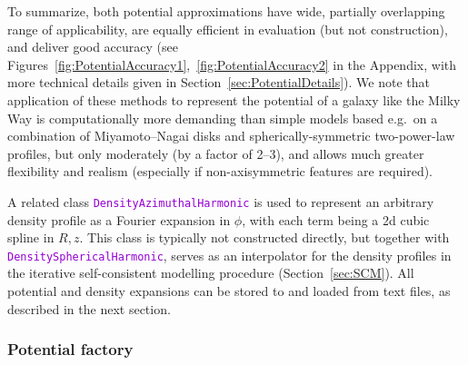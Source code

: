 \documentclass[12pt]{article}
\newcommand{\ttt}[1]{\textcolor{darkviolet}{\texttt{#1}}}
\begin{document}
To summarize, both potential approximations have wide, partially overlapping range of applicability, are equally efficient in evaluation (but not construction), and deliver good accuracy (see Figures~\ref{fig:PotentialAccuracy1},~\ref{fig:PotentialAccuracy2} in the Appendix, with more technical details given in Section~\ref{sec:PotentialDetails}).
We note that application of these methods to represent the potential of a galaxy like the Milky Way is computationally more demanding than simple models based e.g.\ on a combination of Miyamoto--Nagai disks and spherically-symmetric two-power-law profiles, but only moderately (by a factor of 2--3), and allows much greater flexibility and realism (especially if non-axisymmetric features are required).

A related class \ttt{DensityAzimuthalHarmonic} is used to represent an arbitrary density profile as a Fourier expansion in $\phi$, with each term being a 2d cubic spline in $R,z$. This class is typically not constructed directly, but together with \ttt{DensitySphericalHarmonic}, serves as an interpolator for the density profiles in the iterative self-consistent modelling procedure (Section~\ref{sec:SCM}). All potential and density expansions can be stored to and loaded from text files, as described in the next section.


\subsubsection{Potential factory}  \label{sec:PotentialFactory}
\end{document}
